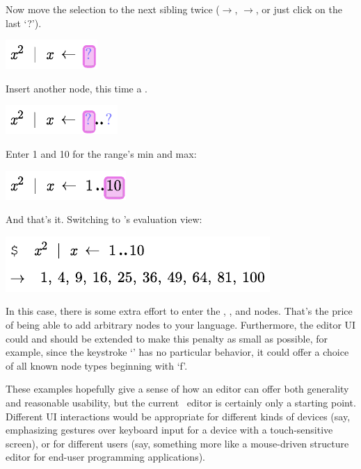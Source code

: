 Now move the selection to the next sibling twice ($\rightarrow$, $\rightarrow$, or just click on the last `?'). 
\begin{center}
\includegraphics{src/image/for5.pdf}
\end{center}

Insert another node, this time a .
\begin{center}
\includegraphics{src/image/for6.pdf}
\end{center}

Enter 1 and 10 for the range's min and max:
\begin{center}
\includegraphics{src/image/for7.pdf}
\end{center}

And that's it. Switching to \Meta's evaluation view:
\begin{center}
\includegraphics{src/image/for.pdf}
\end{center}

In this case, there is some extra effort to enter the , , and  nodes. That's the price of being able to add arbitrary nodes to your language. Furthermore, the editor UI could and should be extended to make this penalty as small as possible, for example, since the keystroke `' has no particular behavior, it could offer a choice of all known node types beginning with `f'.

These examples hopefully give a sense of how an editor can offer both generality and reasonable usability, but the current \Meta\ editor is certainly only a starting point. Different UI interactions would be appropriate for different kinds of devices (say, emphasizing gestures over keyboard input for a device with a touch-sensitive screen), or for different users (say, something more like a mouse-driven structure editor for end-user programming applications).
